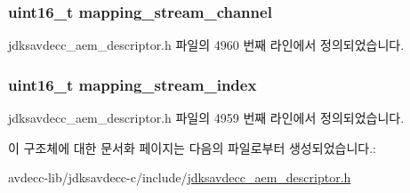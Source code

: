 \subsubsection[{\texorpdfstring{mapping\+\_\+stream\+\_\+channel}{mapping_stream_channel}}]{\setlength{\rightskip}{0pt plus 5cm}uint16\+\_\+t mapping\+\_\+stream\+\_\+channel}\hypertarget{structjdksavdecc__audio__mappings__format_a82e8b562c8e2249f302ed80fc1debadf}{}\label{structjdksavdecc__audio__mappings__format_a82e8b562c8e2249f302ed80fc1debadf}


jdksavdecc\+\_\+aem\+\_\+descriptor.\+h 파일의 4960 번째 라인에서 정의되었습니다.

\subsubsection[{\texorpdfstring{mapping\+\_\+stream\+\_\+index}{mapping_stream_index}}]{\setlength{\rightskip}{0pt plus 5cm}uint16\+\_\+t mapping\+\_\+stream\+\_\+index}\hypertarget{structjdksavdecc__audio__mappings__format_ae776f05f1f60f83a69c154844271ca4a}{}\label{structjdksavdecc__audio__mappings__format_ae776f05f1f60f83a69c154844271ca4a}


jdksavdecc\+\_\+aem\+\_\+descriptor.\+h 파일의 4959 번째 라인에서 정의되었습니다.



이 구조체에 대한 문서화 페이지는 다음의 파일로부터 생성되었습니다.\+:\begin{DoxyCompactItemize}
\item 
avdecc-\/lib/jdksavdecc-\/c/include/\hyperlink{jdksavdecc__aem__descriptor_8h}{jdksavdecc\+\_\+aem\+\_\+descriptor.\+h}\end{DoxyCompactItemize}
